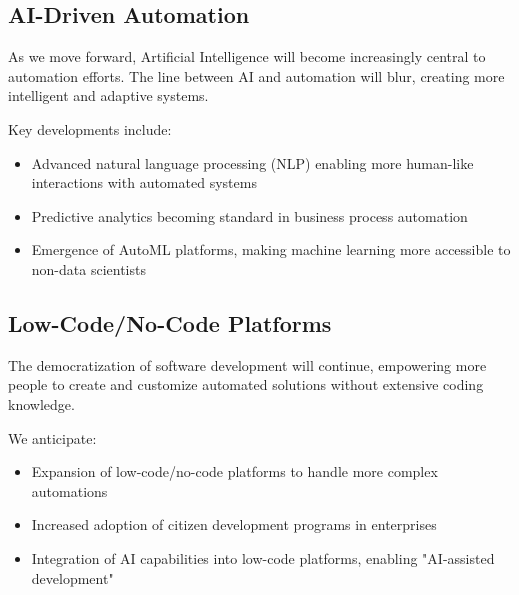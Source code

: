\subsection{AI-Driven Automation}

As we move forward, Artificial Intelligence will become increasingly central to automation efforts. The line between AI and automation will blur, creating more intelligent and adaptive systems.

Key developments include:

\begin{itemize}
    \item Advanced natural language processing (NLP) enabling more human-like interactions with automated systems
    \item Predictive analytics becoming standard in business process automation
    \item Emergence of AutoML platforms, making machine learning more accessible to non-data scientists
\end{itemize}

\subsection{Low-Code/No-Code Platforms}

The democratization of software development will continue, empowering more people to create and customize automated solutions without extensive coding knowledge.

We anticipate:

\begin{itemize}
    \item Expansion of low-code/no-code platforms to handle more complex automations
    \item Increased adoption of citizen development programs in enterprises
    \item Integration of AI capabilities into low-code platforms, enabling "AI-assisted development"
\end{itemize}

